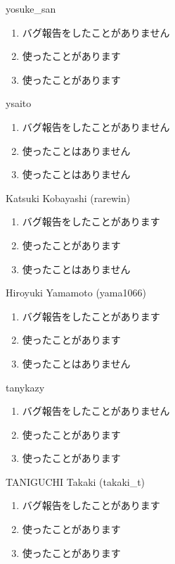 \begin{prework}{ yosuke\_san }
  \begin{enumerate}
  \item バグ報告をしたことがありません
  \item 使ったことがあります
  \item 使ったことがあります
  \end{enumerate}
\end{prework}

\begin{prework}{ ysaito }
  \begin{enumerate}
  \item バグ報告をしたことがありません
  \item 使ったことはありません
  \item 使ったことはありません
  \end{enumerate}
\end{prework}

\begin{prework}{ Katsuki Kobayashi (rarewin) }
  \begin{enumerate}
  \item バグ報告をしたことがあります
  \item 使ったことがあります
  \item 使ったことはありません
  \end{enumerate}
\end{prework}

\begin{prework}{ Hiroyuki Yamamoto (yama1066) }
  \begin{enumerate}
  \item バグ報告をしたことがあります
  \item 使ったことがあります
  \item 使ったことはありません
  \end{enumerate}
\end{prework}

\begin{prework}{ tanykazy }
  \begin{enumerate}
  \item バグ報告をしたことがありません
  \item 使ったことがあります
  \item 使ったことがあります
  \end{enumerate}
\end{prework}

\begin{prework}{ TANIGUCHI Takaki (takaki\_t) }
  \begin{enumerate}
  \item バグ報告をしたことがあります
  \item 使ったことがあります
  \item 使ったことがあります
  \end{enumerate}
\end{prework}

